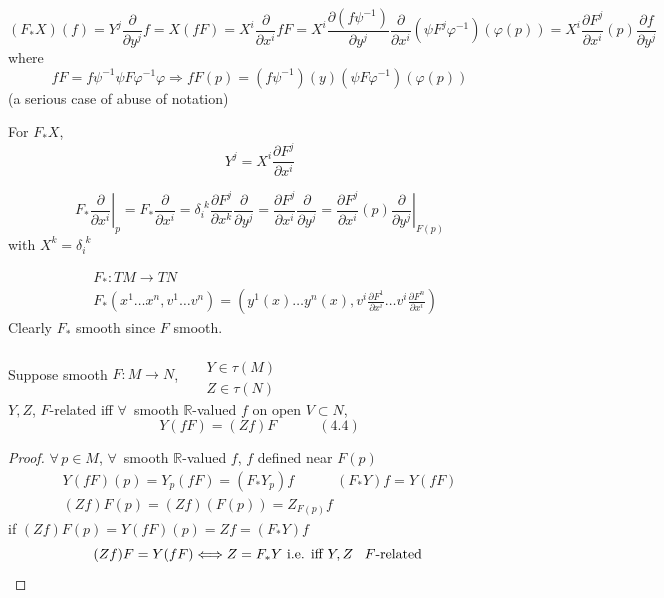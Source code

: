 \[
(F_* X)(f) = Y^j \frac{ \partial }{ \partial y^j} f = X(fF) = X^i \frac{ \partial }{ \partial x^i } fF = X^i \frac{ \partial (f\psi^{-1})}{ \partial y^j} \frac{ \partial }{ \partial x^i } (\psi F^j \varphi^{-1})(\varphi(p)) = X^i \frac{ \partial F^j}{ \partial x^i }(p) \frac{ \partial f}{ \partial y^j}
\]
where
\[
fF = f\psi^{-1} \psi F\varphi^{-1} \varphi \Longrightarrow fF(p) = (f\psi^{-1})(y) (\psi F\varphi^{-1})(\varphi(p))
\]
(a serious case of abuse of notation)

For $F_*X$, 
\[
Y^j = X^i \frac{ \partial F^j}{ \partial x^i}
\]

\[
F_* \left. \frac{ \partial }{ \partial x^i } \right|_p = F_* \frac{ \partial }{ \partial x^i} = \delta_i^{ \, \, k } \frac{ \partial F^j}{ \partial x^k} \frac{ \partial }{ \partial y^j} = \frac{ \partial F^j}{ \partial x^i } \frac{ \partial }{ \partial y^j} = \frac{ \partial F^j}{ \partial x^i}(p) \left. \frac{ \partial }{ \partial y^j } \right|_{F(p)}
\]
with $X^k = \delta_i^{\, \, k}$

\[
\begin{aligned}
  &  F_* : TM \to TN \\
  & F_*( x^1 \dots x^n, v^1 \dots v^n) = (y^1(x) \dots y^n(x), v^i \frac{ \partial F^1}{ \partial x^i} \dots v^i \frac{ \partial F^n}{ \partial x^i} )
\end{aligned}
\]
Clearly $F_*$ smooth since $F$ smooth.  

\begin{lemma}[4.8] Suppose smooth $F: M \to N$, \, $\begin{aligned} & \quad \\ & Y \in \tau(M) \\ & Z \in \tau(N) \end{aligned}$ \\
$Y,Z$, $F$-related iff $\forall \, $ smooth $\mathbb{R}$-valued $f$ on open $V \subset N$, 
\[
Y(fF) = (Zf) F \quad \quad \quad (4.4) 
\]
\end{lemma}

\begin{proof}
  $\forall \, p \in M$, $\forall \, $ smooth $\mathbb{R}$-valued $f$, $f$ defined near $F(p)$
\[
\begin{gathered}
  Y(fF)(p) = Y_p(fF) = (F_* Y_p)f \quad \quad \quad (F_*Y)f = Y(fF) \\ 
  (Zf)F(p) = (Zf)(F(p)) = Z_{F(p)}f  
\end{gathered}
\]
if $(Zf) F(p) = Y(fF)(p) = Zf = (F_*Y) f $ 
\[
(Zf)F = Y(fF) \Longleftrightarrow Z = F_* Y \text{ i.e. iff $Y, Z$ \, $F$-related }
\] 

\end{proof}



